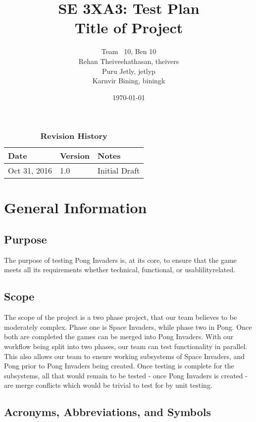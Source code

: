 \documentclass[12pt, titlepage]{article}
\title{SE 3XA3: Test Plan\\Title of Project}
\author{Team \ 10, Ben 10
		\\ Rehan Theiveehathasan, theivers
		\\ Puru Jetly, jetlyp
		\\ Karnvir Bining, biningk
}
\date{\today}
\begin{document}
\maketitle

\tableofcontents
\listoftables
\listoffigures

\begin{table}[bp]
\caption{\bf Revision History}
\begin{tabularx}{\textwidth}{p{3cm}p{2cm}X}
\toprule {\bf Date} & {\bf Version} & {\bf Notes}\\
\midrule
Oct 31, 2016 & 1.0 &  Initial Draft\\
\bottomrule
\end{tabularx}
\end{table}

\newpage


\section{General Information}

\subsection{Purpose}
The purpose of testing Pong Invaders is, at its core, to ensure that
the game meets all its requirements whether technical, functional, or usablilityrelated.


\subsection{Scope}
The scope of the project is a two phase project, that our team
believes to be moderately complex. Phase one is Space Invaders, while phase two
in Pong. Once both are completed the games can be merged into Pong Invaders.
With our workflow being split into two phases, our team can test functionality
in parallel. This also allows our team to ensure working subsystems of Space
Invaders, and Pong prior to Pong Invaders being created. Once testing is
complete for the subsystems, all that would remain to be tested - once Pong
Invaders is created - are merge conflicts which would be trivial to test for by
unit testing.

\subsection{Acronyms, Abbreviations, and Symbols}
	
\end{document}
